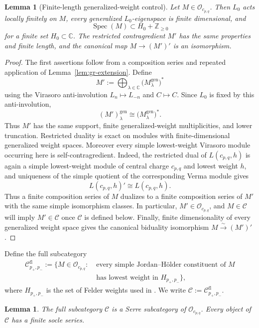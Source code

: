 \documentclass[12pt,leqno]{amsart}
\numberwithin{equation}{section}
\newtheorem{lem}[thm]{Lemma}
\newcommand{\Oc}{\mathcal O}
\def\Z{\mathbb{Z}}
\def\C{\mathbb{C}}
\begin{document}
\begin{lem}[Finite-length generalized-weight control]
\label{lem:Nakano-ambient}
Let $M\in\Oc_{c_{p,q}}$.  Then $L_0$ acts locally finitely on $M$, every
generalized $L_0$-eigenspace is finite dimensional, and
\[
 \operatorname{Spec}(M)\subset H_0+\Z_{\ge0}
\]
for a finite set $H_0\subset\C$.  The restricted contragredient $M'$ has
the same properties and finite length, and the canonical map
$M\to(M')'$ is an isomorphism.
\end{lem}

\begin{proof}
The first assertions follow from a composition series and repeated
application of Lemma~\ref{lem:gr-extension}.  Define
\[
 M':=\bigoplus_{\lambda\in\C}
       \bigl(M^{\mathrm{gen}}_\lambda\bigr)^*
\]
using the Virasoro anti-involution $L_n\mapsto L_{-n}$ and $C\mapsto C$.
Since $L_0$ is fixed by this anti-involution,
\[
 (M')^{\mathrm{gen}}_\lambda
 \cong \bigl(M^{\mathrm{gen}}_\lambda\bigr)^*.
\]
Thus $M'$ has the same support, finite generalized-weight multiplicities,
and lower truncation.  Restricted duality is exact on modules with
finite-dimensional generalized weight spaces.  Moreover every simple lowest-weight Virasoro module occurring here is
self-contragredient.  Indeed, the restricted dual of $L(c_{p,q},h)$ is
again a simple lowest-weight module of central charge $c_{p,q}$ and lowest
weight $h$, and uniqueness of the simple quotient of the corresponding
Verma module gives
\[
 L(c_{p,q},h)'\cong L(c_{p,q},h).
\]
Thus a finite composition series of $M$ dualizes to a finite composition
series of $M'$ with the same simple isomorphism classes.  In particular,
$M'\in\Oc_{c_{p,q}}$, and $M\in\mathscr C$ will imply
$M'\in\mathscr C$ once $\mathscr C$ is defined below.  Finally, finite
dimensionality of every generalized weight space gives the canonical
biduality isomorphism $M\xrightarrow{\sim}(M')'$.
\end{proof}

Define the full subcategory
\[
\begin{aligned}
 \mathscr C^{\mathrm{fl}}_{p_+,p_-}
 :=\bigl\{M\in\Oc_{c_{p,q}}:\;&\text{every simple Jordan--H\"older
 constituent of $M$}\\
 &\text{has lowest weight in }H_{p_+,p_-}\bigr\},
\end{aligned}
\]
where $H_{p_+,p_-}$ is the set of Felder weights used in
\cite[Definition~5.1]{Nakano}.  We write
$\mathscr C:=\mathscr C^{\mathrm{fl}}_{p_+,p_-}$.

\begin{lem}\label{lem:Nakano-Serre}
The full subcategory $\mathscr C$ is a Serre subcategory of
$\Oc_{c_{p,q}}$.  Every object of $\mathscr C$ has a finite socle series.
\end{lem}
\end{document}
